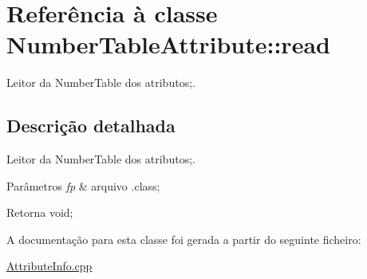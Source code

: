 \hypertarget{class_number_table_attribute_1_1read}{}\section{Referência à classe Number\+Table\+Attribute\+:\+:read}
\label{class_number_table_attribute_1_1read}


Leitor da Number\+Table dos atributos;.  




\subsection{Descrição detalhada}
Leitor da Number\+Table dos atributos;. 


\begin{DoxyParams}{Parâmetros}
{\em fp} & arquivo .class; \\
\hline
\end{DoxyParams}
\begin{DoxyReturn}{Retorna}
void; 
\end{DoxyReturn}


A documentação para esta classe foi gerada a partir do seguinte ficheiro\+:\begin{DoxyCompactItemize}
\item 
\hyperlink{_attribute_info_8cpp}{Attribute\+Info.\+cpp}\end{DoxyCompactItemize}
